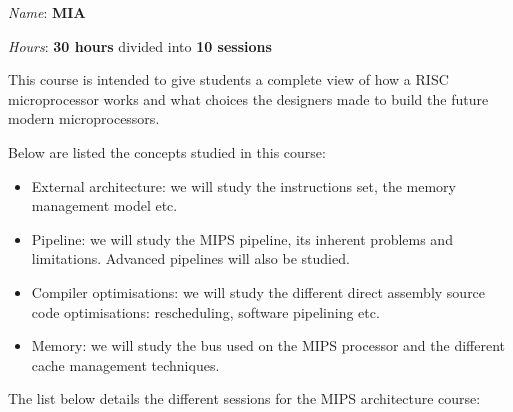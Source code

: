 \begin{multicols}{2}
\textit{Name}: \textbf{MIA}

\textit{Hours}: \textbf{30 hours} divided into \textbf{10 sessions}

This course is intended to give students a complete view of how a RISC
microprocessor works and what choices the designers made to build the
future modern microprocessors.

Below are listed the concepts studied in this course:

\begin{itemize}
  \item
    External architecture: we will study the instructions set,
    the memory management model etc.
  \item
    Pipeline: we will study the MIPS pipeline, its inherent problems
    and limitations. Advanced pipelines will also be studied.
  \item
    Compiler optimisations: we will study the different direct assembly
    source code optimisations: rescheduling, software pipelining etc.
  \item
    Memory: we will study the bus used on the MIPS processor and
    the different cache management techniques.
\end{itemize}

The list below details the different sessions for the MIPS architecture
course:


\end{multicols}
